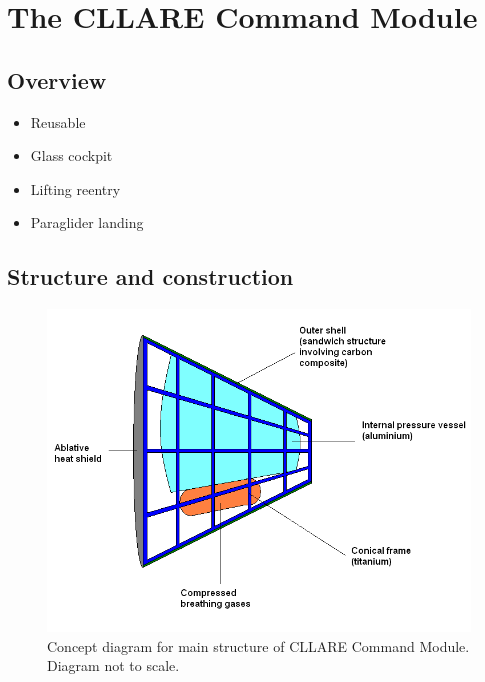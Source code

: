 \documentclass{report}
\begin{document}
\section{The CLLARE Command Module}

\subsection{Overview}

\begin{itemize}
\item Reusable
\item Glass cockpit
\item Lifting reentry
\item Paraglider landing
\end{itemize}

\subsection{Structure and construction}

\begin{figure}[ht] \label{fig:cm_structure}
\centering
\includegraphics[scale=0.6]{images/cllare_cm_structure_concept}
\caption{Concept diagram for main structure of CLLARE Command Module.  Diagram not to scale.}
\end{figure}
\end{document}
